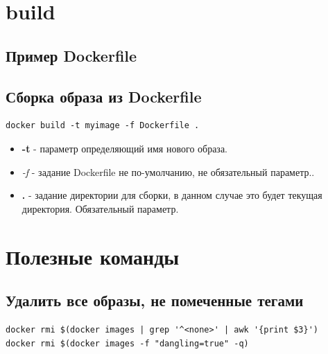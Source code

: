 \section{build}

\subsection{Пример Dockerfile}



\subsection{Сборка образа из Dockerfile}
\begin{lstlisting}
docker build -t myimage -f Dockerfile .
\end{lstlisting}
\begin{itemize}
\item \textbf{-t} - параметр определяющий имя нового образа.
\item \textit{-f} - задание Dockerfile не по-умолчанию, не обязательный параметр..
\item \textbf{.} - задание директории для сборки, в данном случае это будет текущая директория. Обязательный параметр.
\end{itemize}


\section{Полезные команды}
\subsection{Удалить все образы, не помеченные тегами}
\begin{lstlisting}
docker rmi $(docker images | grep '^<none>' | awk '{print $3}')
docker rmi $(docker images -f "dangling=true" -q)
\end{lstlisting}
